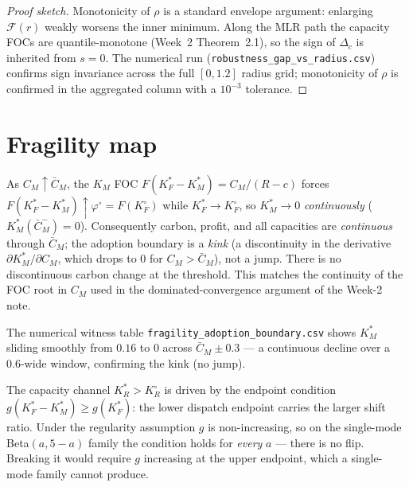 \begin{proof}[Proof sketch]
Monotonicity of $\rho$ is a standard envelope argument: enlarging
$\mathcal F(r)$ weakly worsens the inner minimum. Along the MLR path the
capacity FOCs are quantile-monotone (Week~2 Theorem~2.1), so the sign of
$\Delta_c$ is inherited from $s=0$. The numerical run
(\texttt{robustness\_gap\_vs\_radius.csv}) confirms sign invariance
across the full $[0,1.2]$ radius grid; monotonicity of $\rho$ is confirmed
in the aggregated column with a $10^{-3}$ tolerance.
\end{proof}

\section{Fragility map}
\begin{proposition}\label{r3w3-prop:adoption}
As $C_M \uparrow \bar C_M$, the $K_M$ FOC $F(K_F^\ast-K_M^\ast)=C_M/(R-c)$ forces
$F(K_F^\ast-K_M^\ast)\uparrow\varphi^{\circ}=F(K_F^{\circ})$ while $K_F^\ast\to K_F^{\circ}$,
so $K_M^\ast\to 0$ \emph{continuously} ($K_M^\ast(\bar C_M^-)=0$). Consequently carbon,
profit, and all capacities are \emph{continuous} through $\bar C_M$; the adoption boundary
is a \emph{kink} (a discontinuity in the derivative $\partial K_M^\ast/\partial C_M$, which
drops to $0$ for $C_M>\bar C_M$), not a jump. There is no discontinuous carbon change at
the threshold. This matches the continuity of the FOC root in $C_M$ used in the
dominated-convergence argument of the Week-2 note.
\end{proposition}

The numerical witness table \texttt{fragility\_adoption\_boundary.csv}
shows $K_M^\ast$ sliding smoothly from $0.16$ to $0$ across $\bar C_M \pm 0.3$
--- a continuous decline over a $0.6$-wide window, confirming the kink (no jump).

\begin{proposition}\label{r3w3-prop:endpoint}
The capacity channel $K_R^\ast > K_R^\circ$ is driven by the endpoint
condition $g(K_F^\ast - K_M^\ast) \ge g(K_F^\ast)$: the lower dispatch
endpoint carries the larger shift ratio. Under the regularity assumption
$g$ is non-increasing, so on the single-mode Beta$(a,5-a)$ family the
condition holds for \emph{every} $a$ --- there is no flip. Breaking it
would require $g$ increasing at the upper endpoint, which a single-mode
family cannot produce.
\end{proposition}

